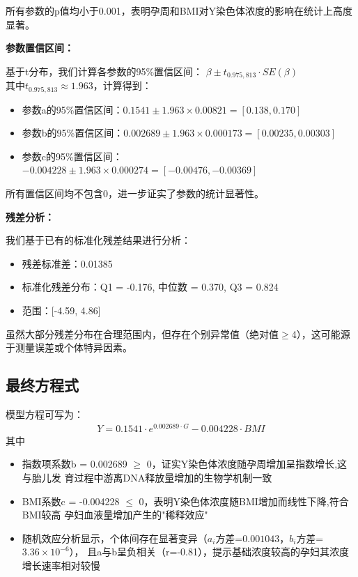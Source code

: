 \documentclass{article}
\begin{document}
所有参数的p值均小于0.001，表明孕周和BMI对Y染色体浓度的影响在统计上高度显著。

\textbf{参数置信区间：}

基于t分布，我们计算各参数的95\%置信区间：
$\beta \pm t_{0.975,813}\cdot SE(\beta)$\\
其中$t_{0.975, 813} \approx 1.963$，计算得到：
\begin{itemize}
    \item 参数a的95\%置信区间：$0.1541\pm1.963\times0.00821 = [0.138, 0.170]$
    \item 参数b的95\%置信区间：$0.002689\pm1.963\times0.000173 = [0.00235, 0.00303]$
    \item 参数c的95\%置信区间：$-0.004228\pm1.963\times0.000274 = [-0.00476, -0.00369]$
\end{itemize}

所有置信区间均不包含0，进一步证实了参数的统计显著性。

\textbf{残差分析：}

我们基于已有的标准化残差结果进行分析：
\begin{itemize}
    \item 残差标准差：0.01385
    \item 标准化残差分布：Q1 = -0.176, 中位数 = 0.370, Q3 = 0.824
    \item 范围：[-4.59, 4.86]
\end{itemize}

虽然大部分残差分布在合理范围内，但存在个别异常值（绝对值$\geq$4），这可能源于测量误差或个体特异因素。
\subsection{\textbf{最终方程式}}
模型方程可写为：
\begin{gather}
    Y=0.1541\cdot e^{0.002689\cdot G}-0.004228\cdot BMI \tag{3}
\end{gather}
其中
\begin{itemize}
    \item 指数项系数b = 0.002689 $\geq$ 0，证实Y染色体浓度随孕周增加呈指数增长,这与胎儿发
          育过程中游离DNA释放量增加的生物学机制一致
    \item BMI系数c = -0.004228 $\leq$ 0，表明Y染色体浓度随BMI增加而线性下降,符合BMI较高
          孕妇血液量增加产生的"稀释效应"
    \item 随机效应分析显示，个体间存在显著变异（$a_i$方差=$0.001043$，$b_i$方差=$3.36×10^{-6}$），
          且a与b呈负相关（r=-0.81），提示基础浓度较高的孕妇其浓度增长速率相对较慢
\end{itemize}
\end{document}
